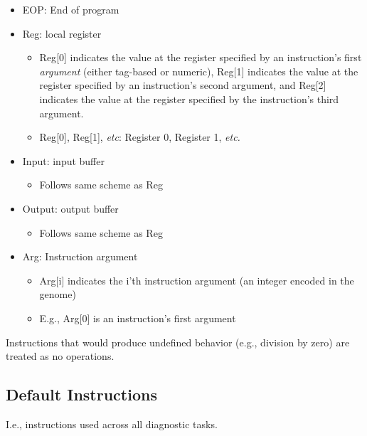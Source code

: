 \documentclass[
]{book}
\providecommand{\tightlist}{%
  \setlength{\itemsep}{0pt}\setlength{\parskip}{0pt}}
\begin{document}
\begin{itemize}
\tightlist
\item
  EOP: End of program
\item
  Reg: local register

  \begin{itemize}
  \tightlist
  \item
    Reg{[}0{]} indicates the value at the register specified by an instruction's first \emph{argument} (either tag-based or numeric), Reg{[}1{]} indicates the value at the register specified by an instruction's second argument, and Reg{[}2{]} indicates the value at the register specified by the instruction's third argument.
  \item
    Reg{[}0{]}, Reg{[}1{]}, \emph{etc}: Register 0, Register 1, \emph{etc.}
  \end{itemize}
\item
  Input: input buffer

  \begin{itemize}
  \tightlist
  \item
    Follows same scheme as Reg
  \end{itemize}
\item
  Output: output buffer

  \begin{itemize}
  \tightlist
  \item
    Follows same scheme as Reg
  \end{itemize}
\item
  Arg: Instruction argument

  \begin{itemize}
  \tightlist
  \item
    Arg{[}i{]} indicates the i'th instruction argument (an integer encoded in the genome)
  \item
    E.g., Arg{[}0{]} is an instruction's first argument
  \end{itemize}
\end{itemize}

Instructions that would produce undefined behavior (e.g., division by zero) are treated as no operations.

\hypertarget{default-instructions}{%
\subsection{Default Instructions}\label{default-instructions}}

I.e., instructions used across all diagnostic tasks.
\end{document}
